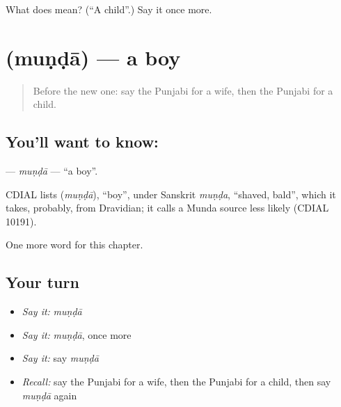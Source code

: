\begin{tcolorbox}[breakable,colback=teal!4,colframe=teal!35!black,title={Before you move on}]
What does  mean? (\textquotedblleft{}A child\textquotedblright{}.) Say it once more.
\end{tcolorbox}
\section[\texorpdfstring{\pa{ਮੁੰਡਾ} (muṇḍā)}{ਮੁੰਡਾ (muṇḍā)}]{ (muṇḍā) — a boy}

\label{lesson:PA-C55-munda}



\begin{quote}
Before the new one: say the Punjabi for a wife, then the Punjabi for a child.
\end{quote}

\subsection*{You'll want to know: }
\textbf{} — \emph{muṇḍā} — \textquotedblleft{}a boy\textquotedblright{}.

\begin{cousinweb}
CDIAL lists \textbf{} (\emph{muṇḍā}), \textquotedblleft{}boy\textquotedblright{}, under Sanskrit \emph{muṇḍa}, \textquotedblleft{}shaved, bald\textquotedblright{}, which it takes, probably, from Dravidian; it calls a Munda source less likely (CDIAL 10191).
\end{cousinweb}

\begin{grammarlens}[title={What you've built}]
One more word for this chapter.
\end{grammarlens}

\subsection*{Your turn}
\begin{itemize}
\raggedright
  \item \emph{Say it:} \emph{muṇḍā}
  \item \emph{Say it:} \emph{muṇḍā}, once more
  \item \emph{Say it:} say \emph{muṇḍā}
  \item \emph{Recall:} say the Punjabi for a wife, then the Punjabi for a child, then say \emph{muṇḍā} again
\end{itemize}

